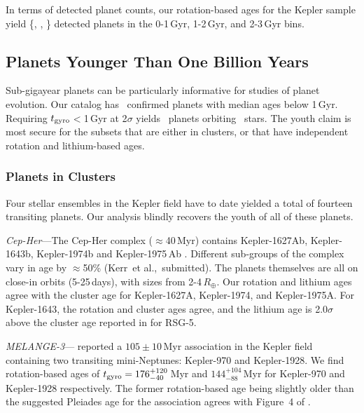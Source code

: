 \documentclass[11pt,twocolumn,tighten]{aastex63}
\begin{document}
In terms of detected planet counts, our rotation-based ages for the
Kepler sample yield \{\nplyounggyro, \nplmidgyro, \nploldgyro\}
detected planets in the 0-1\,Gyr, 1-2\,Gyr, and 2-3\,Gyr bins.  


\subsection{Planets Younger Than One Billion Years}

Sub-gigayear planets can be particularly informative for studies of planet
evolution.
Our catalog has \nplyounggyro\ confirmed planets
with median ages below 1\,Gyr.  Requiring $t_{\rm gyro}$$<$1\,Gyr at
2$\sigma$ yields \nplyounggyrotwosigma\ planets orbiting
\nplhostsyounggyrotwosigma\ stars.  
The youth claim is most secure for the subsets that are either
in clusters, or that have independent rotation and
lithium-based ages.

\subsubsection{Planets in Clusters}
\label{subsec:clusterplanets}

Four stellar ensembles in the Kepler field have to date yielded a
total of fourteen transiting planets.  Our analysis blindly recovers
the youth of all of these planets.

{\it Cep-Her}---The Cep-Her complex ($\approx$40\,Myr)
contains Kepler-1627Ab, Kepler-1643b,
Kepler-1974b and Kepler-1975\,Ab \citep{Bouma_2022b,Bouma_2022a}.
Different sub-groups of the complex vary in age by $\approx$50\%
(Kerr~et al.,~submitted).  The planets
themselves are all on close-in orbits (5-25\,days), with sizes from
2-4\,$R_\oplus$.  Our rotation and lithium ages agree with the cluster age
for Kepler-1627A, Kepler-1974, and Kepler-1975A.  For Kepler-1643, the
rotation and cluster ages agree, and the lithium age is 2.0$\sigma$
above the cluster age reported in \citet{Bouma_2022b} for RSG-5.

{\it MELANGE-3}---\citet{Barber_2022} reported a
$105\pm10$\,Myr association in the Kepler field
containing two transiting mini-Neptunes:
Kepler-970 and Kepler-1928.  We find rotation-based ages
of $t_{\rm
gyro}=176_{-40}^{+120}$\,Myr and $144_{-88}^{+104}$\,Myr for
Kepler-970 and Kepler-1928 respectively.  The former rotation-based
age being slightly older than the suggested Pleiades age for the
association agrees with Figure~4 of \citet{Barber_2022}.
\end{document}
